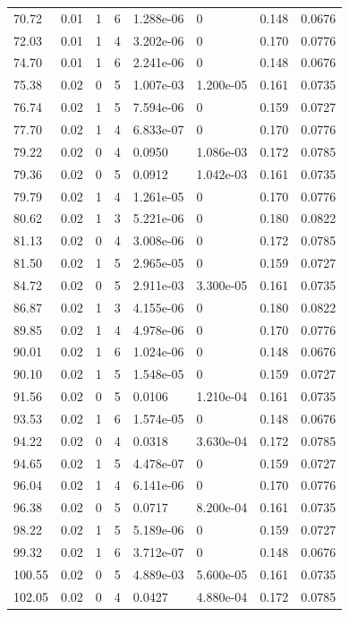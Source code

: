 \documentclass[preview]{standalone}
\begin{document}
{{{\begin{tabular}{L{1.2cm}C{1.2cm} C{0.3cm}C{0.5cm} C{1.4cm}C{1.4cm} C{1.4cm}C{1.4cm}}
  70.72  &  0.01  & 1     &  6 &  1.288e-06  & 0  & 0.148 &  0.0676   \\ 
  72.03  &  0.01  & 1     &  4 &  3.202e-06  & 0  & 0.170 &  0.0776   \\ 
  74.70  &  0.01  & 1     &  6 &  2.241e-06  & 0  & 0.148 &  0.0676   \\ 
  75.38  &  0.02  & 0     &  5 &  1.007e-03  & 1.200e-05  & 0.161 &  0.0735   \\ 
  76.74  &  0.02  & 1     &  5 &  7.594e-06  & 0  & 0.159 &  0.0727   \\ 
  77.70  &  0.02  & 1     &  4 &  6.833e-07  & 0  & 0.170 &  0.0776   \\ 
  79.22  &  0.02  & 0     &  4 &  0.0950  & 1.086e-03  & 0.172 &  0.0785   \\ 
  79.36  &  0.02  & 0     &  5 &  0.0912  & 1.042e-03  & 0.161 &  0.0735   \\ 
  79.79  &  0.02  & 1     &  4 &  1.261e-05  & 0  & 0.170 &  0.0776   \\ 
  80.62  &  0.02  & 1     &  3 &  5.221e-06  & 0  & 0.180 &  0.0822   \\ 
  81.13  &  0.02  & 0     &  4 &  3.008e-06  & 0  & 0.172 &  0.0785   \\ 
  81.50  &  0.02  & 1     &  5 &  2.965e-05  & 0  & 0.159 &  0.0727   \\ 
  84.72  &  0.02  & 0     &  5 &  2.911e-03  & 3.300e-05  & 0.161 &  0.0735   \\ 
  86.87  &  0.02  & 1     &  3 &  4.155e-06  & 0  & 0.180 &  0.0822   \\ 
  89.85  &  0.02  & 1     &  4 &  4.978e-06  & 0  & 0.170 &  0.0776   \\ 
  90.01  &  0.02  & 1     &  6 &  1.024e-06  & 0  & 0.148 &  0.0676   \\ 
  90.10  &  0.02  & 1     &  5 &  1.548e-05  & 0  & 0.159 &  0.0727   \\ 
  91.56  &  0.02  & 0     &  5 &  0.0106  & 1.210e-04  & 0.161 &  0.0735   \\ 
  93.53  &  0.02  & 1     &  6 &  1.574e-05  & 0  & 0.148 &  0.0676   \\ 
  94.22  &  0.02  & 0     &  4 &  0.0318  & 3.630e-04  & 0.172 &  0.0785   \\ 
  94.65  &  0.02  & 1     &  5 &  4.478e-07  & 0  & 0.159 &  0.0727   \\ 
  96.04  &  0.02  & 1     &  4 &  6.141e-06  & 0  & 0.170 &  0.0776   \\ 
  96.38  &  0.02  & 0     &  5 &  0.0717  & 8.200e-04  & 0.161 &  0.0735   \\ 
  98.22  &  0.02  & 1     &  5 &  5.189e-06  & 0  & 0.159 &  0.0727   \\ 
  99.32  &  0.02  & 1     &  6 &  3.712e-07  & 0  & 0.148 &  0.0676   \\ 
  100.55  &  0.02  & 0     &  5 &  4.889e-03  & 5.600e-05  & 0.161 &  0.0735   \\ 
  102.05  &  0.02  & 0     &  4 &  0.0427  & 4.880e-04  & 0.172 &  0.0785   \\ 
\hline 
\end{tabular} 

}}}
\end{document}
